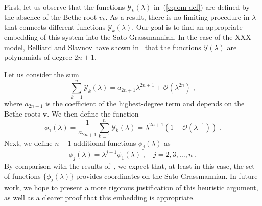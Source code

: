 \documentclass[a4paper,11pt]{amsart}
\begin{document}
\begin{remark}

First, let us observe that the functions \( \mathcal{Y}_k(\lambda) \)
in~(\ref{eq:om-def}) are defined by the absence of the Bethe root \(
v_k \). As a result, there is no limiting procedure in \( \lambda \)
that connects different functions \( \mathcal{Y}_k(\lambda) \). Our
goal is to find an appropriate embedding of this system into the Sato
Grassmannian. In the case of the XXX model, Belliard and Slavnov have
shown in~\cite{Belliard:2019bfz} that the functions \(
\mathcal{Y}(\lambda) \) are polynomials of degree \( 2n + 1 \).

Let us consider the sum
\begin{equation}
  \sum_{k=1}^n \mathcal{Y}_k(\lambda) = a_{2n+1} \lambda^{2n+1} + \mathcal{O}(\lambda^{2n})\;,
\end{equation}
where \( a_{2n+1} \) is the coefficient of the highest-degree term and
depends on the Bethe roots \( \bm{v} \). We then define the function
\begin{equation}
  \phi_1(\lambda) = \frac{1}{a_{2n+1}} \sum_{k=1}^n \mathcal{Y}_k(\lambda)
  = \lambda^{2n+1} \left( 1 + \mathcal{O}(\lambda^{-1}) \right)\;.
\end{equation}
Next, we define \( n-1 \) additional functions \( \phi_j(\lambda) \)
as
\begin{equation}
  \phi_j(\lambda) = \lambda^{j-1} \phi_1(\lambda)\;, \quad j = 2, 3, \dots, n\;.
\end{equation}
By comparison with the results of~\cite{Kharchev:1991cy}, we expect
that, at least in this case, the set of functions \( \{
\phi_j(\lambda) \} \) provides coordinates on the Sato
Grassmannian. In future work, we hope to present a more rigorous
justification of this heuristic argument, as well as a clearer proof
that this embedding is appropriate.
\end{remark}
\end{document}
